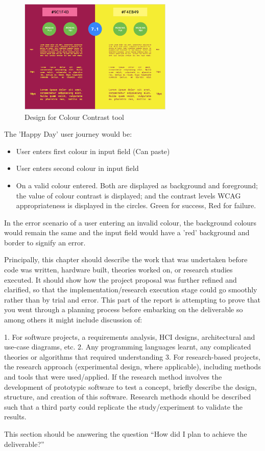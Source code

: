 \begin{figure}[H]
\centering
\includegraphics[width=0.65\textwidth]{figures/colour_contrast_1}
\captionsetup{justification=centering}
\caption{Design for Colour Contrast tool
\label{fig:colour_contrast_1}}
\end{figure}

The 'Happy Day' user journey would be:
\begin{itemize}
\item User enters first colour in input field (Can paste)
\item User enters second colour in input field
\item On a valid colour entered. Both are displayed as background and
foreground; the value of colour contrast is displayed; and the contrast
levels WCAG appropriateness is displayed in the circles. Green for success, Red
for failure.
\end{itemize}

In the error scenario of a user entering an invalid colour, the background
colours would remain the same and the input field would have a 'red'
background and border to signify an error.



Principally, this chapter should describe the work that was undertaken before
code was written, hardware built, theories worked on, or research studies
executed. It should show how the project proposal was further refined and
clarified, so that the implementation/research execution stage could go
smoothly rather than by trial and error. This part of the report is attempting to
prove that you went through a planning process before embarking on the
deliverable so among others it might include discussion of:

1. For software projects, a requirements analysis, HCI designs, architectural
and use-case diagrams, etc.
2. Any programming languages learnt, any complicated theories or algorithms
that required understanding
3. For research-based projects, the research approach (experimental design,
where applicable), including methods and tools that were used/applied. If the
research method involves the development of prototypic software to test a
concept, briefly describe the design, structure, and creation of this software.
Research methods should be described such that a third party could replicate
the study/experiment to validate the results.

This section should be answering the question “How did I plan to achieve the
deliverable?”
